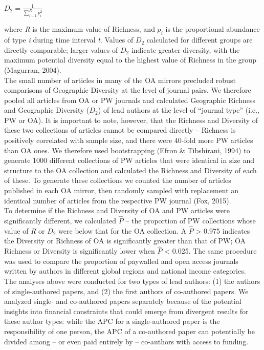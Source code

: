 \documentclass[
  english,
  man]{apa6}
\begin{document}
\(D_{2}=\frac{1}{\sum_{i-1}^{R} p_{i}^{2}}\)

where \emph{R} is the maximum value of Richness, and \(p_{i}\) is the proportional abundance of type \emph{i} during time interval \emph{t}. Values of \(D_{2}\) calculated for different groups are directly comparable; larger values of \(D_{2}\) indicate greater diversity, with the maximum potential diversity equal to the highest value of Richness in the group (Magurran, 2004).\\
The small number of articles in many of the OA mirrors precluded robust comparisons of Geographic Diversity at the level of journal pairs. We therefore pooled all articles from OA or PW journals and calculated Geographic Richness and Geographic Diversity (\(D_{2}\)) of lead authors at the level of \enquote{journal type} (i.e., PW or OA). It is important to note, however, that the Richness and Diversity of these two collections of articles cannot be compared directly -- Richness is positively correlated with sample size, and there were 40-fold more PW articles than OA ones. We therefore used bootstrapping (Efron \& Tibshirani, 1994) to generate 1000 different collections of PW articles that were identical in size and structure to the OA collection and calculated the Richness and Diversity of each of these. To generate these collections we counted the number of articles published in each OA mirror, then randomly sampled with replacement an identical number of articles from the respective PW journal (Fox, 2015).\\
To determine if the Richness and Diversity of OA and PW articles were significantly different, we calculated \(\hat{P}\) -- the proportion of PW collections whose value of \emph{R} or \(D_{2}\) were below that for the OA collection. A \(\hat{P}\) \textgreater{} 0.975 indicates the Diversity or Richness of OA is significantly greater than that of PW; OA Richness or Diversity is significantly lower when \(\hat{P}\) \textless{} 0.025. The same procedure was used to compare the proportion of paywalled and open access journals written by authors in different global regions and national income categories.\\
The analyses above were conducted for two types of lead authors: (1) the authors of single-authored papers, and (2) the first authors of co-authored papers. We analyzed single- and co-authored papers separately because of the potential insights into financial constraints that could emerge from divergent results for these author types: while the APC for a single-authored paper is the responsibility of one person, the APC of a co-authored paper can potentially be divided among -- or even paid entirely by -- co-authors with access to funding.\\
\end{document}
